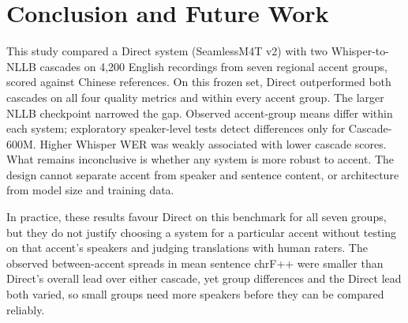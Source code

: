 \section{Conclusion and Future Work}
\label{sec:conclusion}

This study compared a Direct system (SeamlessM4T v2) with two Whisper-to-NLLB
cascades on 4,200 English recordings from seven regional accent groups,
scored against Chinese references. On this frozen set, Direct
outperformed both cascades on all four quality metrics and within every
accent group. The larger NLLB checkpoint narrowed the gap. Observed
accent-group means differ within each system; exploratory speaker-level
tests detect differences only for Cascade-600M.
Higher Whisper WER was weakly associated with lower
cascade scores. What remains inconclusive is whether any system is more
robust to accent. The design cannot separate accent from speaker and
sentence content, or architecture from model size and training data.

In practice, these results favour Direct on this benchmark for all seven
groups, but they do not justify choosing a system for a particular accent
without testing on that accent's speakers and judging translations with
human raters. The observed between-accent spreads in mean sentence chrF++
were smaller than Direct's overall lead over either cascade, yet group
differences and the Direct lead both varied, so small groups need more
speakers before they can be compared reliably.


